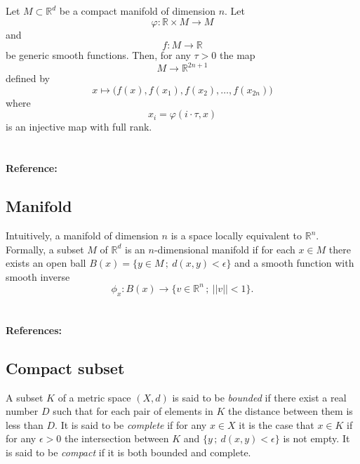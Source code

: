 \documentclass{amsart}
\begin{document}
	Let $M \subset \mathbb R^d$ be a 
	compact manifold of dimension $n$. Let
	\begin{equation*}
	\varphi : \mathbb R \times M \to M
	\end{equation*} 
	and
	\begin{equation*}
	f : M \to \mathbb R
	\end{equation*}
	be generic smooth functions. Then, for any $\tau > 0$ the map
	\begin{equation*}
	M \to \mathbb R^{2n+1}
	\end{equation*}
	defined by
	\begin{equation*}
	x \mapsto\big( f(x), f(x_1), f(x_2), \dots, f(x_{2n}) \big)
	\end{equation*}
	where 
	\begin{equation*}
	x_i = \varphi(i \cdot \tau, x)
	\end{equation*}
	is an injective map with full rank.
	
	\paragraph{\\ Reference:} \cite{takens1981detecting}
	
	\subsection*{Manifold} \label{manifold}
	
	Intuitively, a manifold of dimension $n$ is a space locally equivalent to $\mathbb R^n$. Formally, a subset $M$ of $\mathbb R^d$ is an $n$-dimensional manifold if for each $x \in M$ there exists an open ball $B(x) = \{ y \in M\,;\ d(x,y) < \epsilon\}$ and a smooth function with smooth inverse 
	\begin{equation*}
	\phi_x : B(x) \to \{v \in \mathbb R^n\,;\ ||v||<1\}.
	\end{equation*}
	
	\paragraph{\\ References:} \cite{milnor1997topology,guillemin2010differential}
	
	\subsection*{Compact subset}	\label{compact_subset}
	A subset $K$ of a metric space $(X,d)$ is said to be \textit{bounded} if there exist a real number $D$ such that for each pair of elements in $K$ the distance between them is less than $D$. It is said to be \textit{complete} if for any $x \in X$ it is the case that $x \in K$ if for any $\epsilon > 0$ the intersection between $K$ and $\{y \,;\ d(x,y) < \epsilon \}$ is not empty. It is said to be \textit{compact} if it is both bounded and complete.
	
\end{document}
